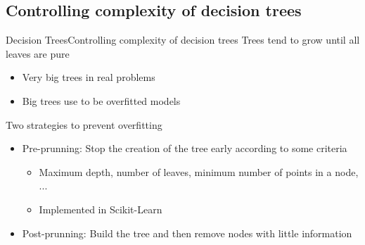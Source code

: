 \documentclass[10pt,compress]{beamer} %
\begin{document}

\subsection{Controlling complexity of decision trees}

\begin{frame}{Decision Trees}{Controlling complexity of decision trees}
    Trees tend to grow until all leaves are pure
    \begin{itemize}
        \item Very big trees in real problems
        \item Big trees use to be overfitted models
    \end{itemize}

    Two strategies to prevent overfitting 
    \begin{itemize}
        \item Pre-prunning: Stop the creation of the tree early according to some criteria
            \begin{itemize}
                \item Maximum depth, number of leaves, minimum number of points in a node, ...
                \item Implemented in Scikit-Learn
            \end{itemize}
        \item Post-prunning: Build the tree and then remove nodes with little information
    \end{itemize}

\end{frame}
\end{document}
